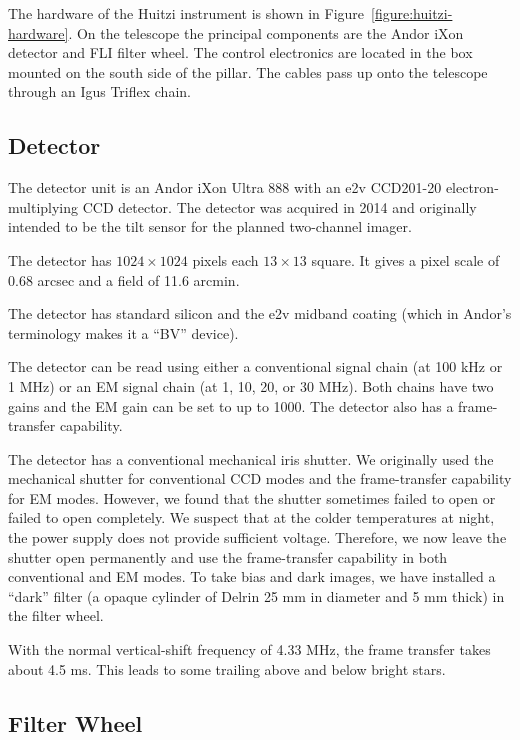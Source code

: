 The hardware of the Huitzi instrument is shown in Figure~\ref{figure:huitzi-hardware}. On the telescope the principal components are the Andor iXon detector and FLI filter wheel. The control electronics are located in the box mounted on the south side of the pillar. The cables pass up onto the telescope through an Igus Triflex chain.

\subsection{Detector}

The detector unit is an Andor iXon Ultra 888 with an e2v CCD201-20 electron-multiplying CCD detector. The detector was acquired in 2014 and originally intended to be the tilt sensor for the planned two-channel imager.

The detector has $1024\times1024$ pixels each $13\times13$ {\micron} square. It gives a pixel scale of 0.68 arcsec and a field of 11.6 arcmin. 

The detector has standard silicon and the e2v midband coating (which in Andor's terminology makes it a “BV” device).

The detector can be read using either a conventional signal chain (at 100 kHz or 1 MHz) or an EM signal chain (at 1, 10, 20, or 30 MHz). Both chains have two gains and the EM gain can be set to up to 1000. The detector also has a frame-transfer capability.

The detector has a conventional mechanical iris shutter. We originally used the mechanical shutter for conventional CCD modes and the frame-transfer capability for EM modes. However, we found that the shutter sometimes failed to open or failed to open completely. We suspect that at the colder temperatures at night, the power supply does not provide sufficient voltage. Therefore, we now leave the shutter open permanently and use the frame-transfer capability in both conventional and EM modes. To take bias and dark images, we have installed a “dark” filter (a opaque cylinder of Delrin 25 mm in diameter and 5 mm thick) in the filter wheel. 

With the normal vertical-shift frequency of 4.33 MHz, the frame transfer takes about 4.5 ms. This leads to some trailing above and below bright stars.

\subsection{Filter Wheel}

